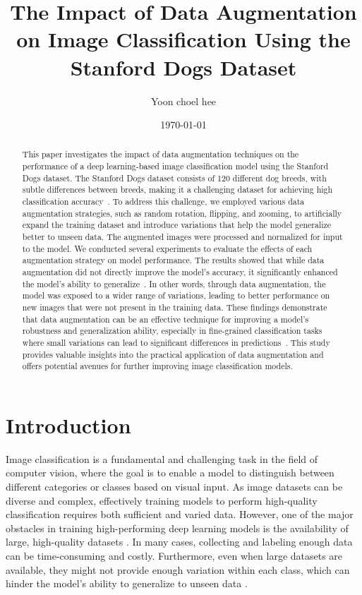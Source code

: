 \documentclass[12pt]{article}
\title{The Impact of Data Augmentation on Image Classification Using the Stanford Dogs Dataset}
\author{Yoon choel hee}
\date{\today}
\begin{document}
\maketitle

\begin{abstract}
This paper investigates the impact of data augmentation techniques on the performance of a deep learning-based image classification model using the Stanford Dogs dataset. The Stanford Dogs dataset consists of 120 different dog breeds, with subtle differences between breeds, making it a challenging dataset for achieving high classification accuracy~\cite{wah2011stanford}. To address this challenge, we employed various data augmentation strategies, such as random rotation, flipping, and zooming, to artificially expand the training dataset and introduce variations that help the model generalize better to unseen data. The augmented images were processed and normalized for input to the model. We conducted several experiments to evaluate the effects of each augmentation strategy on model performance. The results showed that while data augmentation did not directly improve the model’s accuracy, it significantly enhanced the model’s ability to generalize~\cite{krizhevsky2012imagenet}. In other words, through data augmentation, the model was exposed to a wider range of variations, leading to better performance on new images that were not present in the training data. These findings demonstrate that data augmentation can be an effective technique for improving a model’s robustness and generalization ability, especially in fine-grained classification tasks where small variations can lead to significant differences in predictions~\cite{shorten2019survey}. This study provides valuable insights into the practical application of data augmentation and offers potential avenues for further improving image classification models.
\end{abstract}

\section{Introduction}
Image classification is a fundamental and challenging task in the field of computer vision, where the goal is to enable a model to distinguish between different categories or classes based on visual input. As image datasets can be diverse and complex, effectively training models to perform high-quality classification requires both sufficient and varied data. However, one of the major obstacles in training high-performing deep learning models is the availability of large, high-quality datasets \cite{krizhevsky2012imagenet}. In many cases, collecting and labeling enough data can be time-consuming and costly. Furthermore, even when large datasets are available, they might not provide enough variation within each class, which can hinder the model’s ability to generalize to unseen data \cite{zhang2017survey}.
\end{document}
